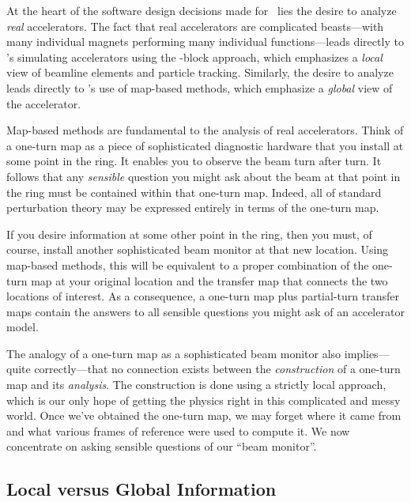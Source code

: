 %
At the heart of the software design decisions made for \PTC\ lies
the desire to analyze \emph{real} accelerators. The fact that real
accelerators are complicated beasts---with many individual magnets
performing many individual functions---leads directly to \PTC's
simulating accelerators using the \LEGO-block approach, which
emphasizes a \emph{local} view of beamline elements and particle
tracking. Similarly, the desire to analyze leads directly to \PTC's
use of map-based methods, which emphasize a \emph{global} view of
the accelerator.

%
Map-based methods are fundamental to the analysis of real
accelerators. Think of a one-turn map as a piece of sophisticated
diagnostic hardware that you install at some point in the ring.
It enables you to observe the beam turn after turn. It follows that
any \emph{sensible} question you might ask about the beam at that
point in the ring must be contained within that one-turn map.
Indeed, all of standard perturbation theory may be expressed
entirely in terms of the one-turn map.\cite{Forest:1990:HamFree}

If you desire information at some other point in the ring, then
you must, of course, install another sophisticated beam monitor
at that new location. Using map-based methods, this will be
equivalent to a proper combination of the one-turn map at your
original location and the transfer map that connects the two
locations of interest. As a consequence, a one-turn map plus
partial-turn transfer maps contain the answers to all sensible
questions you might ask of an accelerator model.

%
The analogy of a one-turn map as a sophisticated beam monitor
also implies---quite correctly---that no connection exists
between the \emph{construction} of a one-turn map and its
\emph{analysis}. The construction is done using a strictly
local approach, which is our only hope of getting the physics
right in this complicated and messy world. Once we've obtained
the one-turn map, we may forget where it came from and what
various frames of reference were used to compute it. We now
concentrate on asking sensible questions of our ``beam monitor''.


\subsection{Local versus Global Information}

